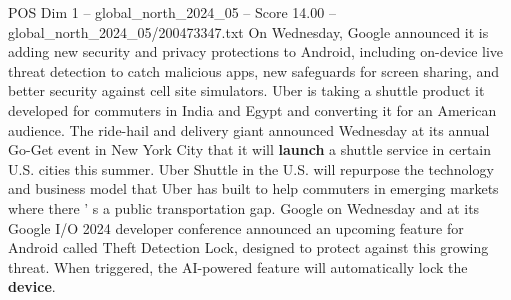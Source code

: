 \begin{textsample}{POS Dim 1 – global\_north\_2024\_05 – Score 14.00 – global\_north\_2024\_05/200473347.txt}
On Wednesday, Google announced it is adding new security and privacy protections to Android, including on-device live threat detection to catch malicious apps, new safeguards for screen sharing, and better security against cell site simulators.
Uber is taking a shuttle product it developed for commuters in India and Egypt and converting it for an American audience.
The ride-hail and delivery giant announced Wednesday at its annual Go-Get event in New York City that it will \textbf{launch} a shuttle service in certain U.S. cities this summer.
Uber Shuttle in the U.S. will repurpose the technology and business model that Uber has built to help commuters in emerging markets where there ' s a public transportation gap.
Google on Wednesday and at its Google I/O 2024 developer conference announced an upcoming feature for Android called Theft Detection Lock, designed to protect against this growing threat.
When triggered, the AI-powered feature will automatically lock the \textbf{device}.

\end{textsample}
